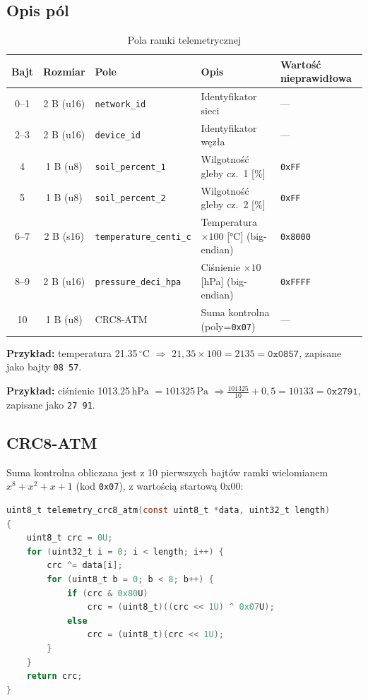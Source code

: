 \documentclass[12pt,a4paper]{article}
\newcommand{\qty}[2]{#1\,\ensuremath{#2}}
\newcommand{\hecto}{\mathrm{h}}
\newcommand{\pascal}{\mathrm{Pa}}
\newcommand{\degreeCelsius}{^{\circ}\mathrm{C}}
\begin{document}
\subsection{Opis pól}

\begin{table}[H]
\centering
\caption{Pola ramki telemetrycznej}
\label{tab:frame}
\begin{tabularx}{\textwidth}{cclXl}
\toprule
\textbf{Bajt} & \textbf{Rozmiar} & \textbf{Pole} & \textbf{Opis} & \textbf{Wartość nieprawidłowa} \\
\midrule
0--1 & 2 B (u16) & \texttt{network\_id} & Identyfikator sieci & — \\
2--3 & 2 B (u16) & \texttt{device\_id}  & Identyfikator węzła & — \\
\rowcolor{byteB!40}
4    & 1 B (u8)  & \texttt{soil\_percent\_1} & Wilgotność gleby cz.~1 [\%] & \texttt{0xFF} \\
\rowcolor{byteB!40}
5    & 1 B (u8)  & \texttt{soil\_percent\_2} & Wilgotność gleby cz.~2 [\%] & \texttt{0xFF} \\
\rowcolor{byteC!40}
6--7 & 2 B (s16) & \texttt{temperature\_centi\_c} & Temperatura $\times 100$ [°C] (big-endian) & \texttt{0x8000} \\
\rowcolor{byteD!40}
8--9 & 2 B (u16) & \texttt{pressure\_deci\_hpa} & Ciśnienie $\times 10$ [hPa] (big-endian) & \texttt{0xFFFF} \\
\rowcolor{byteE!40}
10   & 1 B (u8)  & CRC8-ATM & Suma kontrolna (poly=\texttt{0x07}) & — \\
\bottomrule
\end{tabularx}
\end{table}

\textbf{Przykład:} temperatura \qty{21.35}{\degreeCelsius} $\Rightarrow$
$21{,}35 \times 100 = 2135 = \texttt{0x0857}$, zapisane jako bajty
\texttt{08 57}.

\textbf{Przykład:} ciśnienie \qty{1013.25}{\hecto\pascal} $= \qty{101325}{\pascal}$
$\Rightarrow \frac{101325}{10} + 0{,}5 = 10133 = \texttt{0x2791}$, zapisane jako
\texttt{27 91}.

\subsection{CRC8-ATM}

Suma kontrolna obliczana jest z 10 pierwszych bajtów ramki wielomianem
$x^8 + x^2 + x + 1$ (kod \texttt{0x07}), z wartością startową 0x00:

\begin{lstlisting}[language=C, caption={Implementacja CRC8-ATM (telemetry\_frame.c)}]
uint8_t telemetry_crc8_atm(const uint8_t *data, uint32_t length)
{
    uint8_t crc = 0U;
    for (uint32_t i = 0; i < length; i++) {
        crc ^= data[i];
        for (uint8_t b = 0; b < 8; b++) {
            if (crc & 0x80U)
                crc = (uint8_t)((crc << 1U) ^ 0x07U);
            else
                crc = (uint8_t)(crc << 1U);
        }
    }
    return crc;
}
\end{lstlisting}
\end{document}
